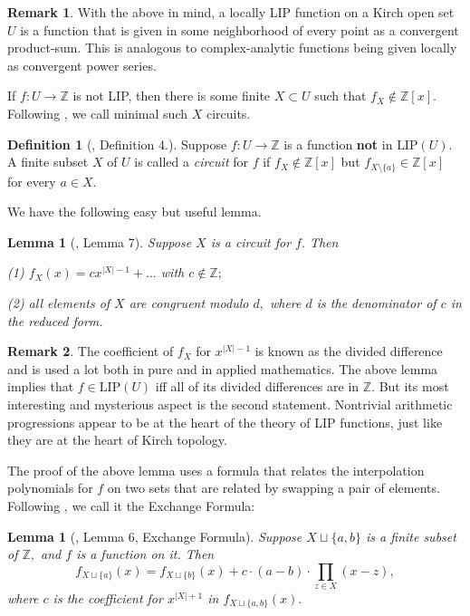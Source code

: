 \documentclass[10pt]{article}
\newtheorem{lemma}[theorem]{Lemma}
\theoremstyle{definition}
\newtheorem{definition}{Definition}
\newtheorem{remark}{Remark}
\begin{document}
\begin{remark} With the above in mind, a locally LIP function on a Kirch open  set $U$ is a function that is given in some neighborhood of every point as a convergent product-sum. This is analogous to complex-analytic functions being given locally as convergent power series.
\end{remark}

If $f:U\to \mathbb Z$ is not LIP, then there is some finite $X\subset U$ such that $f_X\notin \mathbb Z[x].$  Following \cite{LIP}, we call minimal such $X$ circuits.

\begin{definition}[\cite{LIP}, Definition 4.] Suppose $f\colon U\to \mathbb Z$ is a function {\bf not} in $\text{LIP}(U).$ A finite subset $X$ of $U$ is called a {\it circuit} for $f$ if $f_X\notin \mathbb Z[x] $ but $f_{X\setminus \{a\}}\in \mathbb Z[x]$ for every $a\in X.$ 
\end{definition}

We have the following easy but useful lemma.

\begin{lemma}[\cite{LIP}, Lemma 7] \label{Circuit Lemma} Suppose $X$ is a circuit for $f.$ Then

{\it (1)}  $f_X(x)=cx^{|X|-1}+\ldots$ with $c\notin \mathbb Z;$

{\it (2)} all elements of $X$ are congruent modulo $d,$ where $d$ is the denominator of $c$ in the reduced form. 
\end{lemma}

\begin{remark} The coefficient of $f_X$  for $x^{|X|-1}$ is known as the divided difference and is used a lot both in pure and in applied mathematics. The above lemma implies that $f\in \text{LIP}(U)$ iff all of its divided differences are in $\mathbb Z.$ But its most interesting and mysterious aspect is the second statement. Nontrivial arithmetic progressions appear to be at the heart of the theory of LIP functions, just like they are at the heart of Kirch topology. 
\end{remark}

The proof of the above lemma uses a formula that relates the interpolation polynomials for $f$ on two sets that are related by swapping a pair of elements. Following \cite{LIP}, we call it the Exchange Formula:

\begin{lemma}[\cite{LIP}, Lemma 6, Exchange Formula] Suppose $X\sqcup \{a,b\}$ is a finite subset of $\mathbb Z,$ and $f$ is a function on it. Then
$$f_{X\sqcup \{a\}}(x)=f_{X\sqcup \{b\}}(x)+c\cdot (a-b)\cdot \prod \limits_{z\in X} (x-z),$$
where $c$ is the coefficient for $x^{|X|+1}$ in $f_{X\sqcup \{a,b\}}(x).$
\end{lemma}
\end{document}
